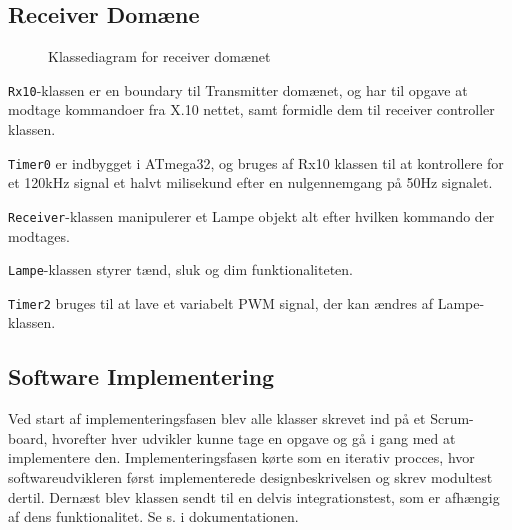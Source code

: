 \subsection{Receiver Domæne}

\begin{figure}[h]
	\centering {}
	\caption{Klassediagram for receiver domænet}
\end{figure}

\texttt{Rx10}-klassen er en boundary til Transmitter domænet, og har til opgave at modtage kommandoer fra X.10 nettet, samt formidle dem til receiver controller klassen.

\texttt{Timer0} er indbygget i ATmega32, og bruges af Rx10 klassen til at kontrollere for et 120kHz signal et halvt milisekund efter en nulgennemgang på 50Hz signalet.

\texttt{Receiver}-klassen manipulerer et Lampe objekt alt efter hvilken kommando der modtages.

\texttt{Lampe}-klassen styrer tænd, sluk og dim funktionaliteten.

\texttt{Timer2} bruges til at lave et variabelt PWM signal, der kan ændres af Lampe-klassen.


\subsection{Software Implementering}

Ved start af implementeringsfasen blev alle klasser skrevet ind på et Scrum-board, hvorefter hver udvikler kunne tage en opgave og gå i gang med at implementere den. Implementeringsfasen kørte som en iterativ procces, hvor softwareudvikleren først implementerede designbeskrivelsen og skrev modultest dertil. Dernæst blev klassen sendt til en delvis integrationstest, som er afhængig af dens funktionalitet. Se s. \pageref{P-TxUART} i dokumentationen.

